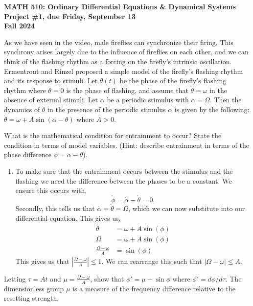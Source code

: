 \documentclass[12pt]{article}
\begin{document}
\begin{center}
\noindent
{\bf MATH 510: Ordinary Differential Equations \& Dynamical Systems \\
Project \#1, due Friday, September 13\\
Fall 2024}
\end{center}


\noindent
As we have seen in the video, male fireflies can synchronize their firing. This synchrony arises largely due to the influence of fireflies on each other, and we can think of the flashing rhythm as a forcing on the firefly's intrinsic oscillation. Ermentrout and Rinzel  proposed a simple model of the firefly's flashing rhythm and its response to stimuli. Let $\theta(t)$ be the phase of the firefly's flashing rhythm where $\theta=0$ is the phase of flashing, and assume that $\dot{\theta} = \omega$ in the absence of external stimuli. Let $\alpha$ be a periodic stimulus with $\dot{\alpha}=\Omega$. Then the dynamics of $\theta$ in the presence of the periodic stimulus  $\alpha$ is given by the following:
$
\dot{\theta}=\omega + A\sin(\alpha-\theta)
$
where $A>0$.

\vspace{.1in}
What is the mathematical condition for entrainment to occur? State the condition in terms of model variables. (Hint: describe entrainment in terms of the phase difference $\phi = \alpha - \theta$).

\begin{enumerate}
    \item To make sure that the entrainment occurs between the stimulus and the flashing we need the difference between the phases to be a constant. We ensure this occurs with,
    $$
    \dot{\phi} = \dot{\alpha} - \dot{\theta} = 0.
    $$
    Secondly, this tells us that $\dot{\alpha} = \dot{\theta} = \Omega$, which we can now substitute into our differential equation. This gives us,
    \begin{align*}
        \dot{\theta} &= \omega + A\sin(\phi) \\
        \Omega &= \omega + A\sin(\phi) \\
        \frac{\Omega - \omega}{A} &= \sin(\phi)
    \end{align*}
    This gives us that $\left|\frac{\Omega-\omega}{A}\right| \leq 1$. We can rearrange this such that $|\Omega - \omega| \leq A.$
\end{enumerate}


\vspace{.2in}
Letting $\tau = At$ and $\displaystyle \mu = \frac{\Omega - \omega}{A}$, show that $\phi' =  \mu - \sin \phi$ where $\phi' = d\phi/d\tau$. The dimensionless group $\mu$ is a measure of the frequency difference relative to the resetting strength.
\end{document}

